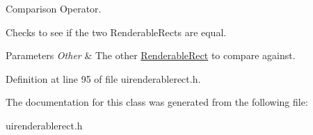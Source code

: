 Comparison Operator. 

Checks to see if the two RenderableRects are equal. 
\begin{DoxyParams}{Parameters}
{\em Other} & The other \hyperlink{structphys_1_1UI_1_1RenderableRect}{RenderableRect} to compare against. \\
\hline
\end{DoxyParams}


Definition at line 95 of file uirenderablerect.h.



The documentation for this class was generated from the following file:\begin{DoxyCompactItemize}
\item 
uirenderablerect.h\end{DoxyCompactItemize}
